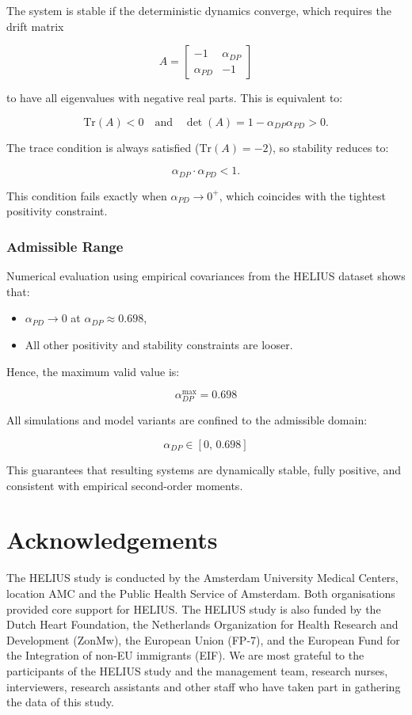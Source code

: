 \documentclass[
]{article}
\providecommand{\tightlist}{%
  \setlength{\itemsep}{0pt}\setlength{\parskip}{0pt}}\usepackage{longtable,booktabs,array}
\begin{document}
The system is stable if the deterministic dynamics converge, which
requires the drift matrix

\[
A = \begin{bmatrix}
-1 & \alpha_{DP} \\
\alpha_{PD} & -1
\end{bmatrix}
\]

to have all eigenvalues with negative real parts. This is equivalent to:

\[
\text{Tr}(A) < 0 \quad \text{and} \quad \det(A) = 1 - \alpha_{DP} \alpha_{PD} > 0.
\]

The trace condition is always satisfied (\(\text{Tr}(A) = -2\)), so
stability reduces to:

\[
\alpha_{DP} \cdot \alpha_{PD} < 1.
\]

This condition fails exactly when \(\alpha_{PD} \to 0^+\), which
coincides with the tightest positivity constraint.

\subsubsection{Admissible Range}\label{admissible-range}

Numerical evaluation using empirical covariances from the HELIUS dataset
shows that:

\begin{itemize}
\tightlist
\item
  \(\alpha_{PD} \to 0\) at \(\alpha_{DP} \approx 0.698\),
\item
  All other positivity and stability constraints are looser.
\end{itemize}

Hence, the maximum valid value is:

\[
\boxed{\alpha_{DP}^{\max} = 0.698}
\]

All simulations and model variants are confined to the admissible
domain:

\[
\alpha_{DP} \in [0,\, 0.698]
\]

This guarantees that resulting systems are dynamically stable, fully
positive, and consistent with empirical second-order moments.

\section*{Acknowledgements}\label{acknowledgements}

The HELIUS study is conducted by the Amsterdam University Medical
Centers, location AMC and the Public Health Service of Amsterdam. Both
organisations provided core support for HELIUS. The HELIUS study is also
funded by the Dutch Heart Foundation, the Netherlands Organization for
Health Research and Development (ZonMw), the European Union (FP-7), and
the European Fund for the Integration of non-EU immigrants (EIF). We are
most grateful to the participants of the HELIUS study and the management
team, research nurses, interviewers, research assistants and other staff
who have taken part in gathering the data of this study.
\end{document}
